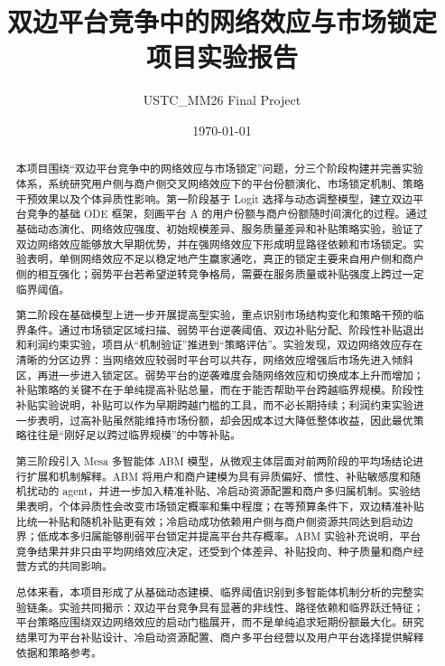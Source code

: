 \documentclass[UTF8,zihao=-4]{ctexart}
\title{\bfseries 双边平台竞争中的网络效应与市场锁定\\项目实验报告}
\author{USTC\_MM26 Final Project}
\date{\today}
\begin{document}
\maketitle

\begin{abstract}
本项目围绕“双边平台竞争中的网络效应与市场锁定”问题，分三个阶段构建并完善实验体系，系统研究用户侧与商户侧交叉网络效应下的平台份额演化、市场锁定机制、策略干预效果以及个体异质性影响。第一阶段基于 Logit 选择与动态调整模型，建立双边平台竞争的基础 ODE 框架，刻画平台 A 的用户份额与商户份额随时间演化的过程。通过基础动态演化、网络效应强度、初始规模差异、服务质量差异和补贴策略实验，验证了双边网络效应能够放大早期优势，并在强网络效应下形成明显路径依赖和市场锁定。实验表明，单侧网络效应不足以稳定地产生赢家通吃，真正的锁定主要来自用户侧和商户侧的相互强化；弱势平台若希望逆转竞争格局，需要在服务质量或补贴强度上跨过一定临界阈值。

第二阶段在基础模型上进一步开展提高型实验，重点识别市场结构变化和策略干预的临界条件。通过市场锁定区域扫描、弱势平台逆袭阈值、双边补贴分配、阶段性补贴退出和利润约束实验，项目从“机制验证”推进到“策略评估”。实验发现，双边网络效应存在清晰的分区边界：当网络效应较弱时平台可以共存，网络效应增强后市场先进入倾斜区，再进一步进入锁定区。弱势平台的逆袭难度会随网络效应和切换成本上升而增加；补贴策略的关键不在于单纯提高补贴总量，而在于能否帮助平台跨越临界规模。阶段性补贴实验说明，补贴可以作为早期跨越门槛的工具，而不必长期持续；利润约束实验进一步表明，过高补贴虽然能维持市场份额，却会因成本过大降低整体收益，因此最优策略往往是“刚好足以跨过临界规模”的中等补贴。

第三阶段引入 Mesa 多智能体 ABM 模型，从微观主体层面对前两阶段的平均场结论进行扩展和机制解释。ABM 将用户和商户建模为具有异质偏好、惯性、补贴敏感度和随机扰动的 agent，并进一步加入精准补贴、冷启动资源配置和商户多归属机制。实验结果表明，个体异质性会改变市场锁定概率和集中程度；在等预算条件下，双边精准补贴比统一补贴和随机补贴更有效；冷启动成功依赖用户侧与商户侧资源共同达到启动边界；低成本多归属能够削弱平台锁定并提高平台共存概率。ABM 实验补充说明，平台竞争结果并非只由平均网络效应决定，还受到个体差异、补贴投向、种子质量和商户经营方式的共同影响。

总体来看，本项目形成了从基础动态建模、临界阈值识别到多智能体机制分析的完整实验链条。实验共同揭示：双边平台竞争具有显著的非线性、路径依赖和临界跃迁特征；平台策略应围绕双边网络效应的启动门槛展开，而不是单纯追求短期份额最大化。研究结果可为平台补贴设计、冷启动资源配置、商户多平台经营以及用户平台选择提供解释依据和策略参考。
\end{abstract}
\end{document}
